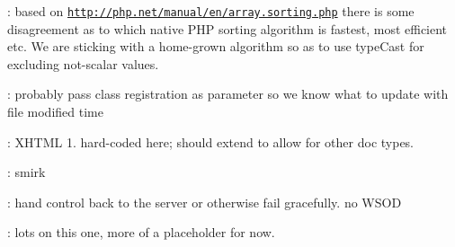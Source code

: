 
\begin{DoxyRefList}
\item[\label{todo__todo000002}%
\hypertarget{todo__todo000002}{}%
Global \hyperlink{class_able_polecat___data___primitive___scalar___integer_ab0ca104ebb3288467244dbfaeaa474ed}{Able\+Polecat\+\_\+\+Data\+\_\+\+Primitive\+\_\+\+Scalar\+\_\+\+Integer\+:\+:max} (\$numbers)]\+: based on \href{http://php.net/manual/en/array.sorting.php}{\tt http\+://php.\+net/manual/en/array.\+sorting.\+php} there is some disagreement as to which native P\+H\+P sorting algorithm is fastest, most efficient etc. We are sticking with a home-\/grown algorithm so as to use type\+Cast for excluding not-\/scalar values. 
\item[\label{todo__todo000004}%
\hypertarget{todo__todo000004}{}%
Global \hyperlink{class_able_polecat___dom_af8f857ffafb0c1e59d752b7b430a95a0}{Able\+Polecat\+\_\+\+Dom\+:\+:load\+Template\+Fragment} (D\+O\+M\+Document \$\+Document, \$template\+Search\+Paths, \$dom\+Directives=N\+U\+L\+L)]\+: probably pass class registration as parameter so we know what to update with file modified time 
\item[\label{todo__todo000003}%
\hypertarget{todo__todo000003}{}%
Global \hyperlink{class_able_polecat___dom_a9687e5f2a0ad8e40fbf6de213dc8e077}{Able\+Polecat\+\_\+\+Dom\+:\+:X\+H\+T\+M\+L\+\_\+1\+\_\+1\+\_\+\+Q\+U\+A\+L\+I\+F\+I\+E\+D\+\_\+\+N\+A\+M\+E} ]\+: X\+H\+T\+M\+L 1. hard-\/coded here; should extend to allow for other doc types.  
\item[\label{todo__todo000006}%
\hypertarget{todo__todo000006}{}%
Global \hyperlink{class_able_polecat___message___response_abstract_a1211a3dcd44d6bfe7f0205151465a677}{Able\+Polecat\+\_\+\+Message\+\_\+\+Response\+Abstract\+:\+:validate\+Header\+Field} (\$field)]\+: smirk  
\item[\label{todo__todo000007}%
\hypertarget{todo__todo000007}{}%
Global \hyperlink{class_able_polecat___mode___server_a7e7be427ff1899a7386be4019db2d59d}{Able\+Polecat\+\_\+\+Mode\+\_\+\+Server\+:\+:handle\+Exception} (Exception \$\+Exception)]\+: hand control back to the server or otherwise fail gracefully. no W\+S\+O\+D  
\item[\label{todo__todo000009}%
\hypertarget{todo__todo000009}{}%
Global \hyperlink{class_able_polecat___query_language___statement_abstract_a7e8b7ade103075378490c24d61b098bd}{Able\+Polecat\+\_\+\+Query\+Language\+\_\+\+Statement\+Abstract\+:\+:get\+Literal\+Expression} (\$literal, \$type=N\+U\+L\+L)]\+: lots on this one, more of a placeholder for now. 


\end{DoxyRefList}
